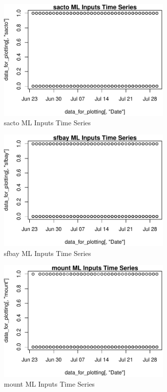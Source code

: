 \begin{figure} 
\centering  
\includegraphics[width=0.77\textwidth]{Code_Outputs/ML_input_report_AllforCaret_cleaned_StepPractice_part_practice_sactoTS.pdf} 
\caption{\label{fig:ML_input_report_AllforCaret_cleaned_StepPractice_part_practicesactoTS}sacto ML Inputs Time Series} 
\end{figure} 
 

\begin{figure} 
\centering  
\includegraphics[width=0.77\textwidth]{Code_Outputs/ML_input_report_AllforCaret_cleaned_StepPractice_part_practice_sfbayTS.pdf} 
\caption{\label{fig:ML_input_report_AllforCaret_cleaned_StepPractice_part_practicesfbayTS}sfbay ML Inputs Time Series} 
\end{figure} 
 

\begin{figure} 
\centering  
\includegraphics[width=0.77\textwidth]{Code_Outputs/ML_input_report_AllforCaret_cleaned_StepPractice_part_practice_mountTS.pdf} 
\caption{\label{fig:ML_input_report_AllforCaret_cleaned_StepPractice_part_practicemountTS}mount ML Inputs Time Series} 
\end{figure} 
 

